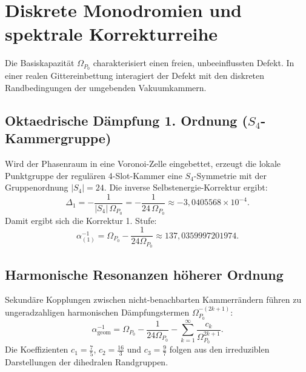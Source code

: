 \documentclass[11pt,a4paper]{article}
\begin{document}
\section{Diskrete Monodromien und spektrale Korrekturreihe}\label{sec:corrections}
Die Basiskapazität $\Omega_{P_0}$ charakterisiert einen freien, unbeeinflussten Defekt. In einer realen Gittereinbettung interagiert der Defekt mit den diskreten Randbedingungen der umgebenden Vakuumkammern.

\subsection{Oktaedrische Dämpfung 1. Ordnung ($S_4$-Kammergruppe)}
Wird der Phasenraum in eine Voronoi-Zelle eingebettet, erzeugt die lokale Punktgruppe der regulären 4-Slot-Kammer eine $S_4$-Symmetrie mit der Gruppenordnung $|S_4| = 24$. Die inverse Selbstenergie-Korrektur ergibt:
\begin{equation}
\Delta_1 = -\frac{1}{|S_4|\,\Omega_{P_0}} = -\frac{1}{24\,\Omega_{P_0}} \approx -3{,}0405568 \times 10^{-4}.
\end{equation}
Damit ergibt sich die Korrektur 1. Stufe:
\begin{equation}
\alpha_{(1)}^{-1} = \Omega_{P_0} - \frac{1}{24\Omega_{P_0}} \approx 137{,}0359997201974.
\end{equation}

\subsection{Harmonische Resonanzen höherer Ordnung}
Sekundäre Kopplungen zwischen nicht-benachbarten Kammerrändern führen zu ungeradzahligen harmonischen Dämpfungstermen $\Omega_{P_0}^{-(2k+1)}$:
\begin{equation}
\alpha_{\text{geom}}^{-1} = \Omega_{P_0} - \frac{1}{24\Omega_{P_0}} - \sum_{k=1}^{\infty} \frac{c_k}{\Omega_{P_0}^{2k+1}}.
\end{equation}
Die Koeffizienten $c_1 = \frac{7}{5}$, $c_2 = \frac{16}{3}$ und $c_3 = \frac{9}{7}$ folgen aus den irreduziblen Darstellungen der dihedralen Randgruppen.
\end{document}
